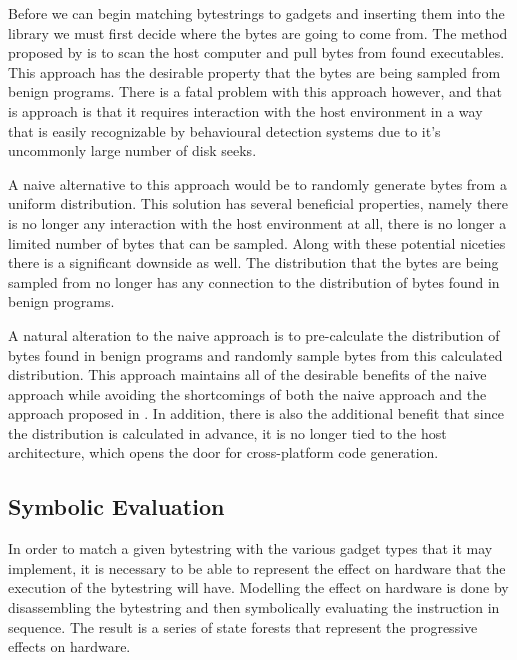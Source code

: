     Before we can begin matching bytestrings to gadgets and inserting them into
    the library we must first decide where the bytes are going to come from.
    The method proposed by \cite{franken} is to scan the host computer and pull
    bytes from found executables. This approach has the desirable property that
    the bytes are being sampled from benign programs. There is a fatal problem
    with this approach however, and that is approach is that it requires
    interaction with the host environment in a way that is easily recognizable
    by behavioural detection systems due to it's uncommonly large number of disk
    seeks.

    A naive alternative to this approach would be to randomly generate bytes
    from a uniform distribution. This solution has several beneficial
    properties, namely there is no longer any interaction with the host
    environment at all, there is no longer a limited number of bytes that can be
    sampled. Along with these potential niceties there is a significant downside
    as well. The distribution that the bytes are being sampled from no longer
    has any connection to the distribution of bytes found in benign programs.

    A natural alteration to the naive approach is to pre-calculate the
    distribution of bytes found in benign programs and randomly sample bytes
    from this calculated distribution. This approach maintains all of the
    desirable benefits of the naive approach while avoiding the shortcomings of
    both the naive approach and the approach proposed in \cite{franken}. In
    addition, there is also the additional benefit that since the distribution
    is calculated in advance, it is no longer tied to the host architecture,
    which opens the door for cross-platform code generation.

    \subsection{Symbolic Evaluation}

    In order to match a given bytestring with the various gadget types that it
    may implement, it is necessary to be able to represent the effect on
    hardware that the execution of the bytestring will have. Modelling the
    effect on hardware is done by disassembling the bytestring and then
    symbolically evaluating the instruction in sequence. The result is a series
    of state forests that represent the progressive effects on hardware.

